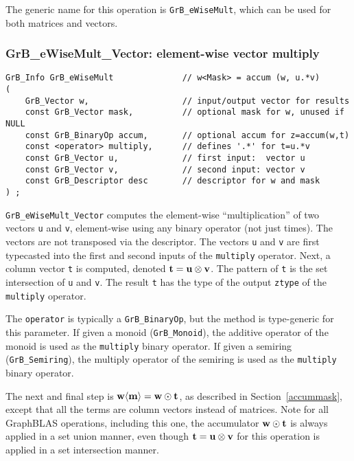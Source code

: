 \documentclass[12pt]{article}
\begin{document}
The generic name for this operation is \verb'GrB_eWiseMult', which can be used
for both matrices and vectors.

\newpage
\subsubsection{{\sf GrB\_eWiseMult\_Vector:} element-wise vector multiply}
\label{eWiseMult_vector}

\begin{mdframed}[userdefinedwidth=6in]
{\footnotesize
\begin{verbatim}
GrB_Info GrB_eWiseMult              // w<Mask> = accum (w, u.*v)
(
    GrB_Vector w,                   // input/output vector for results
    const GrB_Vector mask,          // optional mask for w, unused if NULL
    const GrB_BinaryOp accum,       // optional accum for z=accum(w,t)
    const <operator> multiply,      // defines '.*' for t=u.*v
    const GrB_Vector u,             // first input:  vector u
    const GrB_Vector v,             // second input: vector v
    const GrB_Descriptor desc       // descriptor for w and mask
) ;
\end{verbatim}
} \end{mdframed}

\verb'GrB_eWiseMult_Vector' computes the element-wise ``multiplication'' of two
vectors \verb'u' and \verb'v', element-wise using any binary operator (not just
times).  The vectors are not transposed via the descriptor.  The vectors
\verb'u' and \verb'v' are first typecasted into the first and second inputs of
the \verb'multiply' operator.  Next, a column vector \verb't' is computed,
denoted ${\bf t = u \otimes v}$.  The pattern of \verb't' is the set
intersection of \verb'u' and \verb'v'.  The result \verb't' has the type of the
output \verb'ztype' of the \verb'multiply' operator.

The \verb'operator' is typically a \verb'GrB_BinaryOp', but the method is
type-generic for this parameter.  If given a monoid (\verb'GrB_Monoid'), the
additive operator of the monoid is used as the \verb'multiply' binary operator.
If given a semiring (\verb'GrB_Semiring'), the multiply operator of the
semiring is used as the \verb'multiply' binary operator.

The next and final step is ${\bf w \langle m \rangle  = w \odot t}$, as
described in Section~\ref{accummask}, except that all the terms are column
vectors instead of matrices.  Note for all GraphBLAS operations, including this
one, the accumulator ${\bf w \odot t}$ is always applied in a set union manner,
even though ${\bf t = u \otimes v}$ for this operation is applied in a set
intersection manner.
\end{document}
